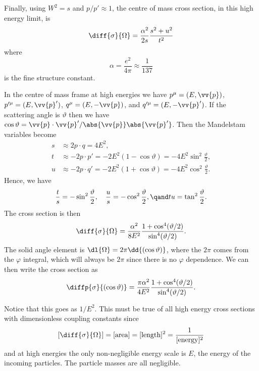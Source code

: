 \documentclass[fleqn]{NotesClass}
\begin{document}
    Finally, using \(W^2 = s\) and \(p/p' \approx 1\), the centre of mass cross section, in this high energy limit, is
    \begin{equation}
        \diff{\sigma}{\Omega} = \frac{\alpha^2}{2s} \frac{s^2 + u^2}{t^2}
    \end{equation}
    where
    \begin{equation}
        \alpha = \frac{e^2}{4\pi} \approx \frac{1}{137}
    \end{equation}
    is the fine structure constant.
    
    In the centre of mass frame at high energies we have \(p^\mu = (E, \vv{p})\), \(p'^\mu = (E, \vv{p}')\), \(q^\mu = (E, -\vv{p})\), and \(q'^\mu = (E, -\vv{p}')\).
    If the scattering angle is \(\vartheta\) then we have \(\cos\vartheta = \vv{p} \cdot \vv{p}'/\abs{\vv{p}} \abs{\vv{p}'}\).
    Then the Mandelstam variables become
    \begin{align}
        s &\approx 2 p \cdot q = 4E^2,\\
        t &\approx -2p \cdot p' = -2E^2(1 - \cos\vartheta) = -4E^2\sin^2 \frac{\vartheta}{2},\\
        u &\approx -2p \cdot q' = -2E^2(1 + \cos\vartheta) = -4E^2\cos^2 \frac{\vartheta}{2}.
    \end{align}
    Hence, we have
    \begin{equation}
        \frac{t}{s} = -\sin^2\frac{\vartheta}{2}, \quad \frac{u}{s} = - \cos^2\frac{\vartheta}{2}, \qand tu = \tan^2\frac{\vartheta}{2}.
    \end{equation}
    The cross section is then
    \begin{equation}
        \diff{\sigma}{\Omega} = \frac{\alpha^2}{8E^2} \frac{1 + \cos^4 (\vartheta/2)}{\sin^4(\vartheta/2)}.
    \end{equation}
    The solid angle element is \(\dl{\Omega} = 2\pi \dd{(\cos\vartheta)}\), where the \(2\pi\) comes from the \(\varphi\) integral, which will always be \(2\pi\) since there is no \(\varphi\) dependence.
    We can then write the cross section as
    \begin{equation}
        \diffp{\sigma}{(\cos\vartheta)} = \frac{\pi\alpha^2}{4E^2} \frac{1 + \cos^4(\vartheta/2)}{\sin^4(\vartheta/2)}.
    \end{equation}
    
    Notice that this goes as \(1/E^2\).
    This must be true of all high energy cross sections with dimensionless coupling constants since
    \begin{equation}
        \left[ \diff{\sigma}{\Omega} \right] = [\text{area}] = [\text{length}]^2 = \frac{1}{[\text{energy}]^2}
    \end{equation}
    and at high energies the only non-negligible energy scale is \(E\), the energy of the incoming particles.
    The particle masses are all negligible.
    
\end{document}
